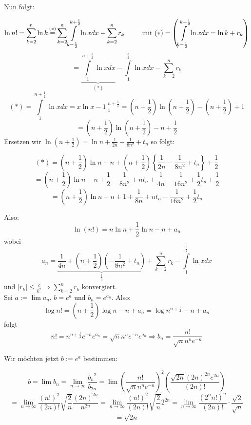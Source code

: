 Nun folgt:

\[\ln n! = \sum\limits_{k = 2}^n {\ln k\mathop  = \limits^{( * )} \sum\limits_{k = 2}^n {\int\limits_{k - \frac{1}{2}}^{k + \frac{1}{2}} {\ln xdx} }  - \sum\limits_{k = 2}^n {{r_k}} } \text{\hspace{8mm} mit }( * )=\left( {\int\limits_{k - \frac{1}{2}}^{k + \frac{1}{2}} {\ln xdx = \ln k + {r_k}} } \right) \]
\[ = \underbrace {\int\limits_1^{n + \frac{1}{2}} {\ln xdx} }_{( * )} - \int\limits_1^{\frac{3}{2}} {\ln xdx - \sum\limits_{k = 2}^n {{r_k}} } \]
\[( * ) = \int\limits_1^{n + \frac{1}{2}} {\ln xdx = \left. {x\ln x - 1} \right|_1^{n + \frac{1}{2}}}  = \left( {n + \frac{1}{2}} \right)\ln \left( {n + \frac{1}{2}} \right) - \left( {n + \frac{1}{2}} \right) + 1\]
\[ = \left( {n + \frac{1}{2}} \right)\ln \left( {n + \frac{1}{2}} \right) - n + \frac{1}{2}\]
Ersetzen wir $\ln \left( {n + \frac{1}{2}} \right) = \ln n + \frac{1}{{2n}} - \frac{1}{{8{n^2}}} + {t_n}$ so folgt:

\[(*) = \left( {n + \frac{1}{2}} \right)\ln n - n + \left( {n + \frac{1}{2}} \right)\left\{ {\frac{1}{{2n}} - \frac{1}{{8{n^2}}} + {t_n}} \right\} + \frac{1}{2}\]
\[ = \left( {n + \frac{1}{2}} \right)\ln n - n + \frac{1}{2} - \frac{1}{{8{n^2}}} + n{t_n} + \frac{1}{{4n}} - \frac{1}{{16{n^2}}} + \frac{1}{2}{t_n} + \frac{1}{2}\]
\[ = \left( {n + \frac{1}{2}} \right)\ln n - n + 1 + \frac{1}{{8n}} + n{t_n} - \frac{1}{{16{n^2}}} + \frac{1}{2}{t_n}\]

Also:
\[\ln (n!) = n\ln n + \frac{1}{2}\ln n - n + {a_n}\]
wobei
\[{a_n} = \underbrace {\frac{1}{{4n}} + \left( {n + \frac{1}{2}} \right)\left( { - \frac{1}{{8{n^2}}} + {t_n}} \right)}_{\mathop  \downarrow \limits_0 } + \sum\limits_{k = 2}^n {{r_k} - \int\limits_1^{\frac{3}{2}} {\ln xdx} } \]
und $\left| {{r_k}} \right| \le \frac{c}{{{k^2}}} \Rightarrow \sum\limits_{k = 2}^n {{r_k}} $ konvergiert.\\

\noindent Sei $a:=\lim a_n$, $b=e^a$ und $b_n=e^{a_n}$. Also:
\[\log n! = \left( {n + \frac{1}{2}} \right)\log n - n + {a_n} = \log {n^{n + \frac{1}{2}}} - n + {a_n}\]
folgt 
\[n! = {n^{n + \frac{1}{2}}}{e^{ - n}}{e^{{a_n}}} = \sqrt n {n^n}{e^{ - n}}{e^{{a_n}}} \Rightarrow {b_n} = \frac{{n!}}{{\sqrt n {n^n}{e^{ - n}}}}\]

\noindent Wir möchten jetzt $b:=e^a$ bestimmen:

\[b = \lim {b_n} = \mathop {\lim }\limits_{n \to \infty } \frac{{{b_n}^2}}{{{b_{2n}}}} = \lim {\left( {\frac{{n!}}{{\sqrt n {n^n}{e^{ - n}}}}} \right)^2}\left( {\frac{{\sqrt {2n} {{(2n)}^{2n}}{e^{2n}}}}{{(2n)!}}} \right)\]
\[ = \mathop {\lim }\limits_{n \to \infty } \frac{{{{(n!)}^2}}}{{(2n)!}}\sqrt {\frac{2}{n}} \frac{{{{(2n)}^{2n}}}}{{{n^{2n}}}} = \mathop {\lim }\limits_{n \to \infty } \frac{{{{(n!)}^2}}}{{(2n)!}}\sqrt {\frac{2}{n}} {2^{2n}} = \mathop {\lim }\limits_{n \to \infty } \frac{{{{({2^n}n!)}^n}}}{{(2n)!}} \cdot \frac{{\sqrt 2 }}{{\sqrt n }}\]
\[ = \sqrt {2n} \]

